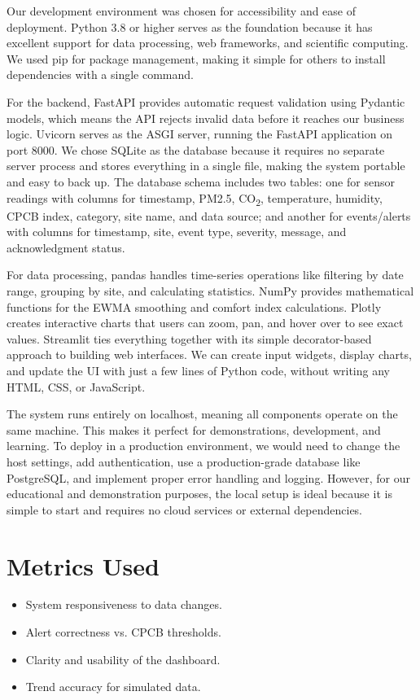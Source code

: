 \documentclass[12pt]{report}
\begin{document}
Our development environment was chosen for accessibility and ease of deployment. Python 3.8 or higher serves as the foundation because it has excellent support for data processing, web frameworks, and scientific computing. We used pip for package management, making it simple for others to install dependencies with a single command.

For the backend, FastAPI provides automatic request validation using Pydantic models, which means the API rejects invalid data before it reaches our business logic. Uvicorn serves as the ASGI server, running the FastAPI application on port 8000. We chose SQLite as the database because it requires no separate server process and stores everything in a single file, making the system portable and easy to back up. The database schema includes two tables: one for sensor readings with columns for timestamp, PM2.5, CO\textsubscript{2}, temperature, humidity, CPCB index, category, site name, and data source; and another for events/alerts with columns for timestamp, site, event type, severity, message, and acknowledgment status.

For data processing, pandas handles time-series operations like filtering by date range, grouping by site, and calculating statistics. NumPy provides mathematical functions for the EWMA smoothing and comfort index calculations. Plotly creates interactive charts that users can zoom, pan, and hover over to see exact values. Streamlit ties everything together with its simple decorator-based approach to building web interfaces. We can create input widgets, display charts, and update the UI with just a few lines of Python code, without writing any HTML, CSS, or JavaScript.

The system runs entirely on localhost, meaning all components operate on the same machine. This makes it perfect for demonstrations, development, and learning. To deploy in a production environment, we would need to change the host settings, add authentication, use a production-grade database like PostgreSQL, and implement proper error handling and logging. However, for our educational and demonstration purposes, the local setup is ideal because it is simple to start and requires no cloud services or external dependencies.

\section{Metrics Used}
\begin{itemize}
  \item System responsiveness to data changes.
  \item Alert correctness vs. CPCB thresholds.
  \item Clarity and usability of the dashboard.
  \item Trend accuracy for simulated data.
\end{itemize}
\end{document}
